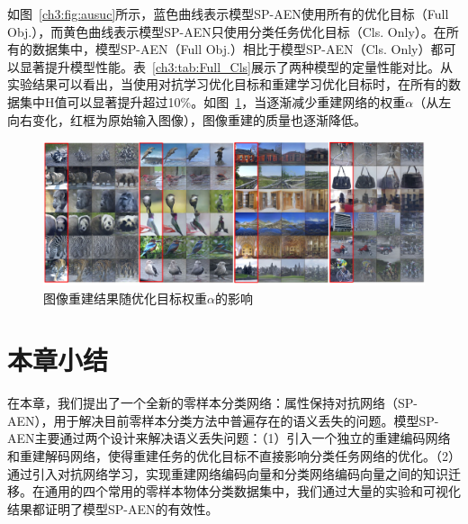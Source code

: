 \begin{table}[t]
\centering
{}
\caption{模型SP-AEN在不同优化目标条件下的性能对比}
\label{ch3:tab:Full_Cls}
\end{table}

如图~\ref{ch3:fig:ausuc}所示，蓝色曲线表示模型SP-AEN使用所有的优化目标（Full Obj.），而黄色曲线表示模型SP-AEN只使用分类任务优化目标（Cls. Only）。在所有的数据集中，模型SP-AEN（Full Obj.）相比于模型SP-AEN（Cls. Only）都可以显著提升模型性能。表~\ref{ch3:tab:Full_Cls}展示了两种模型的定量性能对比。从实验结果可以看出，当使用对抗学习优化目标和重建学习优化目标时，在所有的数据集中H值可以显著提升超过10\%。如图~\ref{ch3:fig:alpha_influence}，当逐渐减少重建网络的权重$\alpha$（从左向右变化，红框为原始输入图像），图像重建的质量也逐渐降低。

\begin{figure}[t]
    \centering
    \includegraphics[width=0.99\linewidth]{chapter3/res/alpha_influence.pdf}
    \caption{图像重建结果随优化目标权重$\alpha$的影响}
\label{ch3:fig:alpha_influence}
\end{figure}


\section{本章小结}

在本章，我们提出了一个全新的零样本分类网络：属性保持对抗网络（SP-AEN），用于解决目前零样本分类方法中普遍存在的语义丢失的问题。模型SP-AEN主要通过两个设计来解决语义丢失问题：（1）引入一个独立的重建编码网络和重建解码网络，使得重建任务的优化目标不直接影响分类任务网络的优化。（2）通过引入对抗网络学习，实现重建网络编码向量和分类网络编码向量之间的知识迁移。在通用的四个常用的零样本物体分类数据集中，我们通过大量的实验和可视化结果都证明了模型SP-AEN的有效性。



